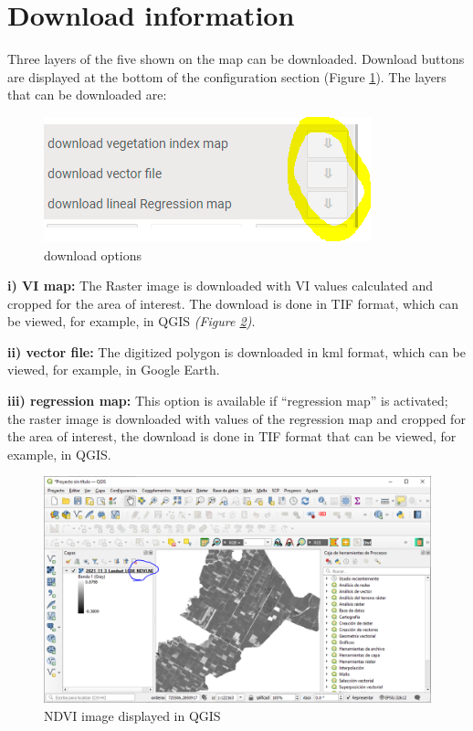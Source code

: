 \documentclass[
]{book}
\begin{document}
\hypertarget{download-information}{%
\section{Download information}\label{download-information}}

Three layers of the five shown on the map can be downloaded. Download buttons are displayed at the bottom of the configuration section (Figure \ref{fig:figI12}). The layers that can be downloaded are:

\begin{figure}

{\centering \includegraphics{./images/Figure62} 

}

\caption{download options}\label{fig:figI12}
\end{figure}

\textbf{i) VI map:} The Raster image is downloaded with VI values calculated and cropped for the area of interest. The download is done in TIF format, which can be viewed, for example, in QGIS \emph{(Figure \ref{fig:figI13})}.

\textbf{ii) vector file:} The digitized polygon is downloaded in kml format, which can be viewed, for example, in Google Earth.

\textbf{iii) regression map:} This option is available if ``regression map'' is activated; the raster image is downloaded with values of the regression map and cropped for the area of interest, the download is done in TIF format that can be viewed, for example, in QGIS.

\begin{figure}

{\centering \includegraphics[width=0.85\linewidth]{./images/Figure63} 

}

\caption{NDVI image displayed in QGIS}\label{fig:figI13}
\end{figure}
\end{document}
